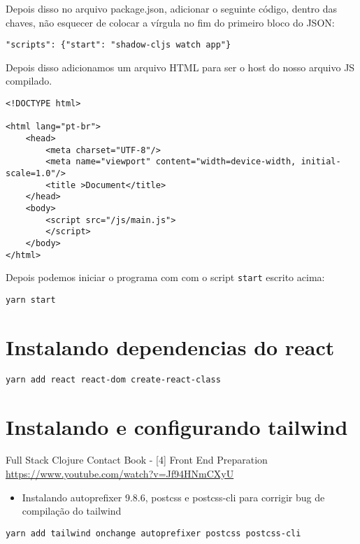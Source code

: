 \documentclass[11pt]{article}
\begin{document}
Depois disso no arquivo package.json, adicionar o seguinte código, dentro das chaves, não esquecer de colocar a vírgula no fim do primeiro bloco do JSON:

\begin{verbatim}
"scripts": {"start": "shadow-cljs watch app"}
\end{verbatim}


Depois disso adicionamos um arquivo HTML para ser o host do nosso arquivo JS compilado.

\begin{verbatim}
<!DOCTYPE html>

<html lang="pt-br">
    <head>
        <meta charset="UTF-8"/>
        <meta name="viewport" content="width=device-width, initial-scale=1.0"/>
        <title >Document</title>
    </head>
    <body>
        <script src="/js/main.js">
        </script>
    </body>
</html>
\end{verbatim}


Depois podemos iniciar o programa com com o script \texttt{start} escrito acima:

\begin{verbatim}
yarn start
\end{verbatim}


\section{Instalando dependencias do react}
\label{sec:orgd9c320d}
\begin{verbatim}
yarn add react react-dom create-react-class
\end{verbatim}


\section{Instalando e configurando tailwind}
\label{sec:orgcee6bd9}
Full Stack Clojure Contact Book - [4] Front End Preparation
\url{https://www.youtube.com/watch?v=Jf94HNmCXyU}

\begin{itemize}
\item Instalando autoprefixer 9.8.6, postcss e postcss-cli para corrigir bug de compilação do tailwind
\end{itemize}

\begin{verbatim}
yarn add tailwind onchange autoprefixer postcss postcss-cli
\end{verbatim}
\end{document}
